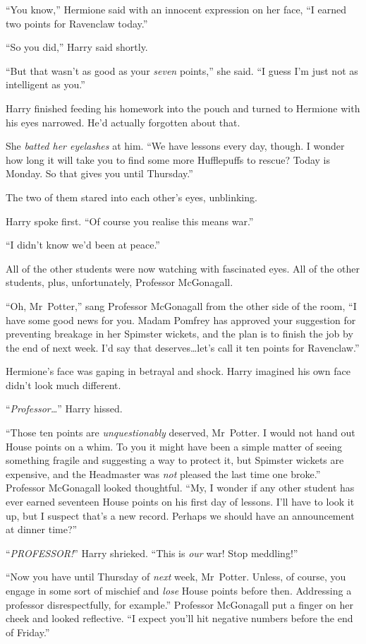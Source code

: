 “You know,” Hermione said with an innocent expression on her face, “I earned
two points for Ravenclaw today.”

“So you did,” Harry said shortly.

“But that wasn’t as good as your \emph{seven} points,” she said. “I guess I’m
just not as intelligent as you.”

Harry finished feeding his homework into the pouch and turned to Hermione with
his eyes narrowed. He’d actually forgotten about that.

She \emph{batted her eyelashes} at him. “We have lessons every day, though. I
wonder how long it will take you to find some more Hufflepuffs to rescue? Today
is Monday. So that gives you until Thursday.”

The two of them stared into each other’s eyes, unblinking.

Harry spoke first. “Of course you realise this means war.”

“I didn’t know we’d been at peace.”

All of the other students were now watching with fascinated eyes. All of the
other students, plus, unfortunately, Professor McGonagall.

“Oh, Mr~Potter,” sang Professor McGonagall from the other side of the room, “I
have some good news for you. Madam Pomfrey has approved your suggestion for
preventing breakage in her Spimster wickets, and the plan is to finish the job
by the end of next week. I’d say that deserves…let’s call it ten points
for Ravenclaw.”

Hermione’s face was gaping in betrayal and shock. Harry imagined his own face
didn’t look much different.

“\emph{Professor…}” Harry hissed.

“Those ten points are \emph{unquestionably} deserved, Mr~Potter. I would not
hand out House points on a whim. To you it might have been a simple matter of
seeing something fragile and suggesting a way to protect it, but Spimster
wickets are expensive, and the Headmaster was \emph{not} pleased the last time
one broke.” Professor McGonagall looked thoughtful. “My, I wonder if any other
student has ever earned seventeen House points on his first day of lessons.
I’ll have to look it up, but I suspect that’s a new record. Perhaps we should
have an announcement at dinner time?”

“\emph{PROFESSOR!}” Harry shrieked. “This is \emph{our} war! Stop meddling!”

“Now you have until Thursday of \emph{next} week, Mr~Potter. Unless, of
course, you engage in some sort of mischief and \emph{lose} House points before
then. Addressing a professor disrespectfully, for example.” Professor
McGonagall put a finger on her cheek and looked reflective. “I expect you’ll
hit negative numbers before the end of Friday.”

